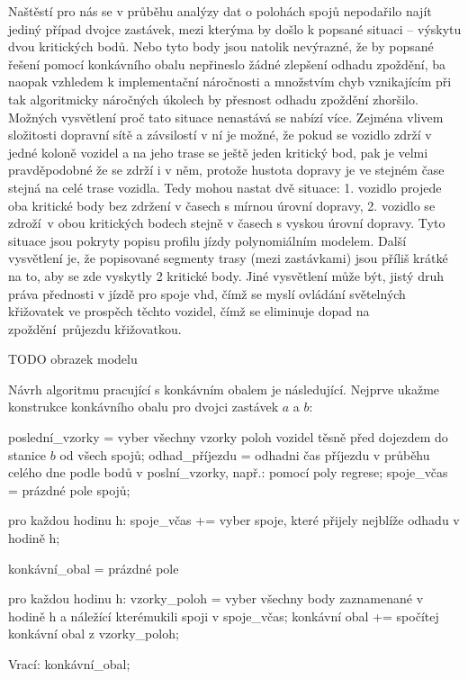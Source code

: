 \bigbreak

Naštěstí pro nás se v průběhu analýzy dat o polohách spojů nepodařilo najít jediný případ dvojce zastávek, mezi kterýma by došlo k popsané situaci -- výskytu dvou kritických bodů. Nebo tyto body jsou natolik nevýrazné, že by popsané řešení pomocí konkávního obalu nepřineslo žádné zlepšení odhadu zpoždění, ba naopak vzhledem k implementační náročnosti a množstvím chyb vznikajícím při tak algoritmicky náročných úkolech by přesnost odhadu zpoždění zhoršilo. Možných vysvětlení proč tato situace nenastává se nabízí více. Zejména vlivem složitosti dopravní sítě a závsilostí v ní je možné, že pokud se vozidlo zdrží v jedné koloně vozidel a na jeho trase se ještě jeden kritický bod, pak je velmi pravděpodobné že se zdrží i v něm, protože hustota dopravy je ve stejném čase stejná na celé trase vozidla. Tedy mohou nastat dvě situace: 1. vozidlo projede oba kritické body bez zdržení v časech s mírnou úrovní dopravy, 2. vozidlo se zdroží v obou kritických bodech stejně v časech s vyskou úrovní dopravy. Tyto situace jsou pokryty popisu profilu jízdy polynomiálním modelem. Další vysvětlení je, že popisované segmenty trasy (mezi zastávkami) jsou příliš krátké na to, aby se zde vyskytly 2 kritické body. Jiné vysvětlení může být, jistý druh práva přednosti v jízdě pro spoje \gls{vhd}, čímž se myslí ovládání světelných křižovatek ve prospěch těchto vozidel, čímž se eliminuje dopad na zpoždění průjezdu křižovatkou.

TODO obrazek modelu

\bigbreak

Návrh algoritmu pracující s konkávním obalem je následující. Nejprve ukažme konstrukce konkávního obalu pro dvojci zastávek $a$ a $b$:

\begin{code}[frame=none]
poslední_vzorky = vyber všechny vzorky poloh vozidel
  těsně před dojezdem do stanice $b$ od všech spojů;
odhad_příjezdu = odhadni čas příjezdu v průběhu celého
  dne podle bodů v poslní_vzorky, např.: pomocí poly regrese;
spoje_včas = prázdné pole spojů;

pro každou hodinu h:
  spoje_včas += vyber spoje, které přijely nejblíže
    odhadu v hodině h;

konkávní_obal = prázdné pole

pro každou hodinu h:
  vzorky_poloh = vyber všechny body zaznamenané
    v hodině h a náležící kterémukili spoji v spoje_včas;
  konkávní obal += spočítej konkávní obal z vzorky_poloh;

Vrací: konkávní_obal;
\end{code}

